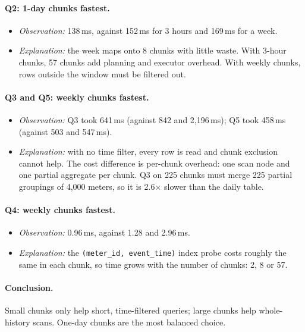 \documentclass[11pt,a4paper]{article}
\begin{document}
\paragraph{Q2: 1-day chunks fastest.}
\begin{itemize}
\item \textit{Observation:} 138\,ms, against 152\,ms for 3 hours and 169\,ms for a week.
\item \textit{Explanation:} the week maps onto 8 chunks with little waste. With
3-hour chunks, 57 chunks add planning and executor overhead. With weekly chunks, rows
outside the window must be filtered out.
\end{itemize}

\paragraph{Q3 and Q5: weekly chunks fastest.}
\begin{itemize}
\item \textit{Observation:} Q3 took 641\,ms (against 842 and 2,196\,ms); Q5 took
458\,ms (against 503 and 547\,ms).
\item \textit{Explanation:} with no time filter, every row is read and chunk
exclusion cannot help. The cost difference is per-chunk overhead: one scan node and one
partial aggregate per chunk. Q3 on 225 chunks must merge 225 partial groupings of 4,000
meters, so it is 2.6$\times$ slower than the daily table.
\end{itemize}

\paragraph{Q4: weekly chunks fastest.}
\begin{itemize}
\item \textit{Observation:} 0.96\,ms, against 1.28 and 2.96\,ms.
\item \textit{Explanation:} the \texttt{(meter\_id, event\_time)} index probe costs
roughly the same in each chunk, so time grows with the number of chunks: 2, 8 or 57.
\end{itemize}

\paragraph{Conclusion.}
Small chunks only help short, time-filtered queries; large chunks help whole-history
scans. One-day chunks are the most balanced choice.
\end{document}
